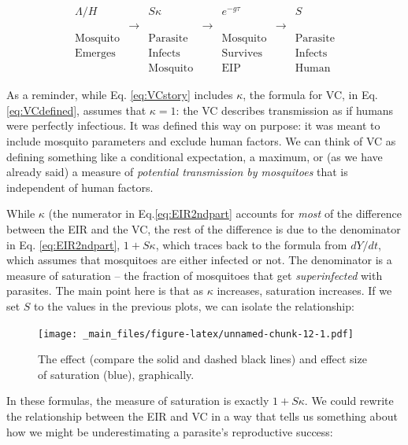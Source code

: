 \documentclass[
]{book}
\begin{document}
\begin{equation}
\begin{array}{|c|c|c|c|c|c|c|}
\Lambda/H &  & S \kappa &  & e^{-g\tau} & & S \\
& \rightarrow &  & \rightarrow &  & \rightarrow &  \\
\mbox{Mosquito} & & \mbox{Parasite} & & \mbox{Mosquito} && \mbox{Parasite} \\
\mbox{Emerges} & & \mbox{Infects} & & \mbox{Survives} && \mbox{Infects} \\
 & & \mbox{Mosquito} & & \mbox{EIP} && \mbox{Human}
\end{array}
\label{eq:VCstory}
\end{equation}

As a reminder, while Eq. \eqref{eq:VCstory} includes \(\kappa\), the formula for VC, in Eq. \eqref{eq:VCdefined}, assumes that \(\kappa=1\): the VC describes transmission as if humans were perfectly infectious. It was defined this way on purpose: it was meant to include mosquito parameters and exclude human factors. We can think of VC as defining something like a conditional expectation, a maximum, or (as we have already said) a measure of \emph{potential transmission by mosquitoes} that is independent of human factors.

While \(\kappa\) (the numerator in Eq.\eqref{eq:EIR2ndpart} accounts for \emph{most} of the difference between the EIR and the VC, the rest of the difference is due to the denominator in Eq. \eqref{eq:EIR2ndpart}, \(1+S\kappa\), which traces back to the formula from \(dY/dt\), which assumes that mosquitoes are either infected or not. The denominator is a measure of saturation -- the fraction of mosquitoes that get \emph{superinfected} with parasites. The main point here is that as \(\kappa\) increases, saturation increases. If we set \(S\) to the values in the previous plots, we can isolate the relationship:

\begin{figure}
\centering
\texttt{[image: \_main\_files/figure-latex/unnamed-chunk-12-1.pdf]}
\caption{\label{fig:unnamed-chunk-12}The effect (compare the solid and dashed black lines) and effect size of saturation (blue), graphically.}
\end{figure}

In these formulas, the measure of saturation is exactly \(1+S\kappa\). We could rewrite the relationship between the EIR and VC in a way
that tells us something about how we might be underestimating a parasite's reproductive success:
\end{document}
